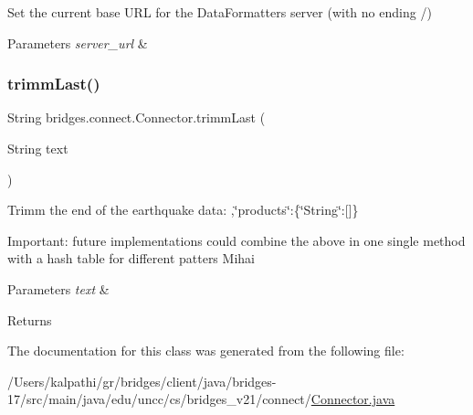 Set the current base U\+RL for the Data\+Formatters server (with no ending /) 
\begin{DoxyParams}{Parameters}
{\em server\+\_\+url} & \\
\hline
\end{DoxyParams}
\mbox{\label{classbridges_1_1connect_1_1_connector_ac0dca0bd99b6abbbd8a77874a95e6d49}} 
\subsubsection{\texorpdfstring{trimm\+Last()}{trimmLast()}}
{\footnotesize\ttfamily String bridges.\+connect.\+Connector.\+trimm\+Last (\begin{DoxyParamCaption}\item[{String}]{text }\end{DoxyParamCaption})}

Trimm the end of the earthquake data\+: ,\char`\"{}products\char`\"{}\+:\{\char`\"{}\+String\char`\"{}\+:\mbox{[}\mbox{]}\}

Important\+: future implementations could combine the above in one single method with a hash table for different patters Mihai 
\begin{DoxyParams}{Parameters}
{\em text} & \\
\hline
\end{DoxyParams}
\begin{DoxyReturn}{Returns}

\end{DoxyReturn}


The documentation for this class was generated from the following file\+:\begin{DoxyCompactItemize}
\item 
/\+Users/kalpathi/gr/bridges/client/java/bridges-\/17/src/main/java/edu/uncc/cs/bridges\+\_\+v21/connect/\mbox{\hyperlink{_connector_8java}{Connector.\+java}}\end{DoxyCompactItemize}
